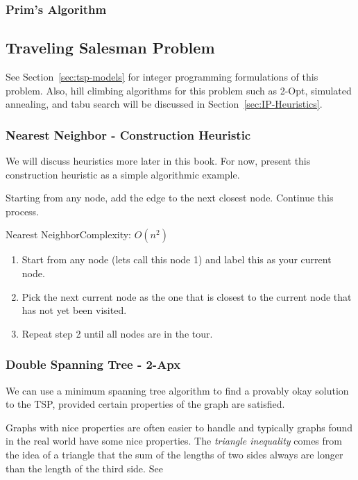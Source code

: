 %

\subsubsection{Prim's Algorithm}


\subsection{Traveling Salesman Problem}

See Section~\ref{sec:tsp-models} for integer programming formulations of this problem.  Also, hill climbing algorithms for this problem such as 2-Opt, simulated annealing, and tabu search will be discussed in Section~\ref{sec:IP-Heuristics}.

\subsubsection{Nearest Neighbor - Construction Heuristic}

We will discuss heuristics more later in this book.   For now, present this construction heuristic as a simple algorithmic example.   


Starting from any node, add the edge to the next closest node.  Continue this process.
\begin{general}{Nearest Neighbor}{Complexity: $O(n^2)$}
\label{heuristic:nearestNeighbor}
\begin{enumerate}
\item Start from any node (lets call this node 1) and label this as your current node.
\item Pick the next current node as the one that is closest to the current node that has not yet been visited.
\item Repeat step 2 until all nodes are in the tour.
\end{enumerate}
\end{general}

\subsubsection{Double Spanning Tree - 2-Apx}
We can use a minimum spanning tree algorithm to find a provably okay solution to the TSP, provided certain properties of the graph are satisfied.  

Graphs with nice properties are often easier to handle and typically graphs found in the real world have some nice properties. The \emph{triangle inequality} comes from the idea of a triangle that the sum of the lengths of two sides always are longer than the length of the third side. See 


